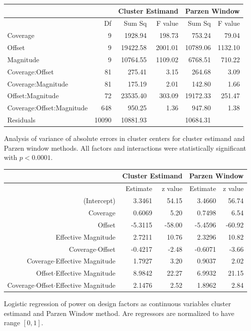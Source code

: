 \begin{FPtable}
\begin{sideways}
\begin{tabular}{lr|rr|rr}
\hline 
 &  & \multicolumn{2}{c|}{Cluster Estimand} & \multicolumn{2}{c}{Parzen Window}\tabularnewline
\hline 
 & Df  & Sum Sq  & F value  & Sum Sq  & F value \tabularnewline
\hline 
Coverage & 9  & 1928.94  & 198.73  & 753.24  & 79.04 \tabularnewline
Offset  & 9  & 19422.58  & 2001.01  & 10789.06  & 1132.10 \tabularnewline
Magnitude  & 9  & 10764.55  & 1109.02 & 6768.51  & 710.22 \tabularnewline
Coverage:Offset  & 81  & 275.41  & 3.15 & 264.68  & 3.09 \tabularnewline
Coverage:Magnitude  & 81  & 175.19  & 2.01 & 142.80  & 1.66 \tabularnewline
Offset:Magnitude  & 72  & 23535.40  & 303.09 & 19172.33  & 251.47 \tabularnewline
Coverage:Offset:Magnitude  & 648  & 950.25  & 1.36  & 947.80  & 1.38 \tabularnewline
Residuals  & 10090  & 10881.93  &  & 10684.31  & \tabularnewline
\hline 
\end{tabular}
\end{sideways}
\caption{Analysis of variance of absolute errors in cluster centers for cluster estimand and Parzen window methods. All factors and interactions were statistically significant with $p<0.0001$.
\label{tab:clusterAnova}
\vspace{72pt}}
\end{FPtable}
\afterpage{\clearpage}

\begin{FPtable}
\begin{sideways}
\begin{tabular}{r|rr|rr}
\hline 
 & \multicolumn{2}{c|}{Cluster Estimand} & \multicolumn{2}{c}{Parzen Window}\tabularnewline
\hline 
 & Estimate  & z value  & Estimate  & z value \tabularnewline
\hline 
(Intercept)  & 3.3461  & 54.15  & 3.4660  & 56.74 \tabularnewline
Coverage & 0.6069  & 5.20  & 0.7498  & 6.54 \tabularnewline
Offset  & -5.3115  & -58.00  & -5.4596  & -60.92 \tabularnewline
Effective Magnitude  & 2.7211  & 10.76  & 2.3296  & 10.82 \tabularnewline
Coverage$\cdot$Offset  & -0.4217  & -2.48  & -0.6071  & -3.66 \tabularnewline
Coverage$\cdot$Effective Magnitude  & 1.7927  & 3.20  & 0.9037  & 2.02 \tabularnewline
Offset$\cdot$Effective Magnitude  & 8.9842  & 22.27  & 6.9932  & 21.15 \tabularnewline
Coverage$\cdot$Offset$\cdot$Effective Magnitude  & 2.1476  & 2.52  & 1.8962  & 2.84 \tabularnewline
\hline 
\end{tabular}
\end{sideways}
\caption{Logistic regression of power on design factors as continuous variables
cluster estimand and Parzen Window method. Are regressors are normalized
to have range $[0,1]$.
\label{tab:clusterGlm}
\vspace{144pt}}
\end{FPtable}
\afterpage{\clearpage}


